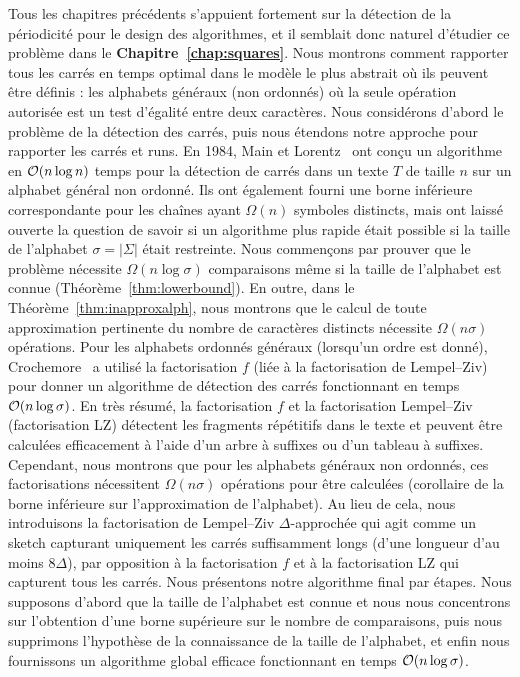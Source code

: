 Tous les chapitres précédents s'appuient fortement sur la détection de la périodicité pour le design des algorithmes, et il semblait donc naturel d'étudier ce problème dans le \textbf{Chapitre~\ref{chap:squares}}. Nous montrons comment rapporter tous les carrés en temps optimal dans le modèle le plus abstrait où ils peuvent être définis : les alphabets généraux (non ordonnés) où la seule opération autorisée est un test d'égalité entre deux caractères. 
Nous considérons d'abord le problème de la détection des carrés, puis nous étendons notre approche pour rapporter les carrés et runs.
% 
En 1984, Main et Lorentz~\cite{Main1984} ont conçu un algorithme en $\mathcal{O}(n\log n)$ temps pour la détection de carrés dans un texte $T$ de taille $n$ sur un alphabet général non ordonné. Ils ont également fourni une borne inférieure correspondante pour les chaînes ayant $\Omega(n)$ symboles distincts, mais ont laissé ouverte la question de savoir si un algorithme plus rapide était possible si la taille de l'alphabet $\sigma=|\Sigma|$ était restreinte.
% 
Nous commençons par prouver que le problème nécessite $\Omega(n \log \sigma)$ comparaisons même si la taille de l'alphabet est connue (Théorème~\ref{thm:lowerbound}). En outre, dans le Théorème~\ref{thm:inapproxalph}, nous montrons que le calcul de toute approximation pertinente du nombre de caractères distincts nécessite $\Omega(n\sigma)$ opérations.
%
Pour les alphabets ordonnés généraux (lorsqu'un ordre est donné), Crochemore~\cite{Crochemore1986} a utilisé la factorisation $f$ (liée à la factorisation de Lempel--Ziv) pour donner un algorithme de détection des carrés fonctionnant en temps $\mathcal{O}(n\log \sigma)$. En très résumé, la factorisation $f$ et la factorisation Lempel--Ziv (factorisation LZ) détectent les fragments répétitifs dans le texte et peuvent être calculées efficacement à l'aide d'un arbre à suffixes ou d'un tableau à suffixes. Cependant, nous montrons que pour les alphabets généraux non ordonnés, ces factorisations nécessitent $\Omega(n\sigma)$ opérations pour être calculées (corollaire de la borne inférieure sur l'approximation de l'alphabet). 
% 
Au lieu de cela, nous introduisons la factorisation de Lempel--Ziv $\Delta$-approchée qui agit comme un sketch capturant uniquement les carrés suffisamment longs (d'une longueur d'au moins $8\Delta$), par opposition à la factorisation $f$ et à la factorisation LZ qui capturent tous les carrés.
Nous présentons notre algorithme final par étapes. Nous supposons d'abord que la taille de l'alphabet est connue et nous nous concentrons sur l'obtention d'une borne supérieure sur le nombre de comparaisons, puis nous supprimons l'hypothèse de la connaissance de la taille de l'alphabet, et enfin nous fournissons un algorithme global efficace fonctionnant en temps $\mathcal{O}(n \log \sigma)$.\\


